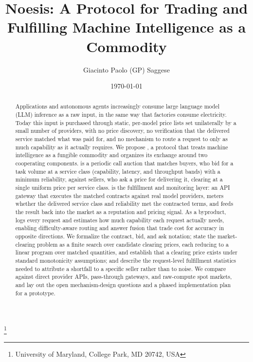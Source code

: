 \title{Noesis: A Protocol for Trading and Fulfilling Machine Intelligence as a Commodity}

\author{Giacinto Paolo (GP) Saggese}
\thanks{University of Maryland, College Park, MD 20742, USA}

\date{\today}





\begin{abstract}
Applications and autonomous agents increasingly consume large language model
(LLM) inference as a raw input, in the same way that factories consume
electricity. Today this input is purchased through static, per-model price
lists set unilaterally by a small number of providers, with no price
discovery, no verification that the delivered service matched what was paid
for, and no mechanism to route a request to only as much capability as it
actually requires.
%
We propose \Noesis, a protocol that treats machine
intelligence as a fungible commodity and organizes its exchange around two
cooperating components.
\NoesisMarket{} is a periodic call auction that matches buyers, who bid for a
task volume at a service class (capability, latency, and throughput bands)
with a minimum reliability, against sellers, who ask a price for delivering
it, clearing at a single uniform price per service class.
%
\NoesisServer{} is the fulfillment and monitoring layer: an API gateway that
executes the matched contracts against real model providers, meters whether
the delivered service class and reliability met the contracted terms,
and feeds the result back into the market as a reputation and pricing signal.
As a byproduct, \NoesisServer{} logs every request and estimates how much
capability each request actually needs, enabling difficulty-aware routing and
answer fusion that trade cost for accuracy in opposite directions.
We formalize the contract, bid, and ask notation; state the market-clearing
problem as a finite search over candidate clearing prices, each reducing to a
linear program over matched quantities, and establish that a clearing price
exists under standard monotonicity assumptions; and describe the
request-level fulfillment
statistics needed to attribute a shortfall to a specific seller rather than
to noise. We compare \Noesis{} against direct provider APIs, pass-through
gateways, and raw-compute spot markets, and lay out the open mechanism-design
questions and a phased implementation plan for a prototype.
\end{abstract}

